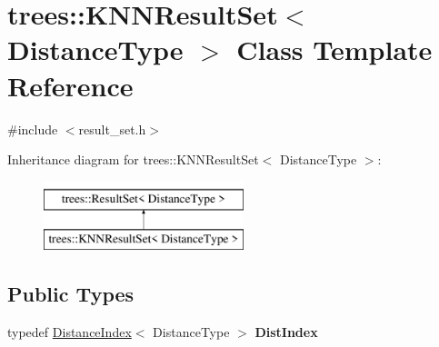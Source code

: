 \hypertarget{classtrees_1_1_k_n_n_result_set}{}\section{trees\+:\+:K\+N\+N\+Result\+Set$<$ Distance\+Type $>$ Class Template Reference}
\label{classtrees_1_1_k_n_n_result_set}


{\ttfamily \#include $<$result\+\_\+set.\+h$>$}

Inheritance diagram for trees\+:\+:K\+N\+N\+Result\+Set$<$ Distance\+Type $>$\+:\begin{figure}[H]
\begin{center}
\leavevmode
\includegraphics[height=2.000000cm]{classtrees_1_1_k_n_n_result_set}
\end{center}
\end{figure}
\subsection*{Public Types}
\begin{DoxyCompactItemize}
\item 
\mbox{\label{classtrees_1_1_k_n_n_result_set_ae243d4e2be3ff92c714898b7fb3b607e}} 
typedef \hyperlink{structtrees_1_1_distance_index}{Distance\+Index}$<$ Distance\+Type $>$ {\bfseries Dist\+Index}
\end{DoxyCompactItemize}
